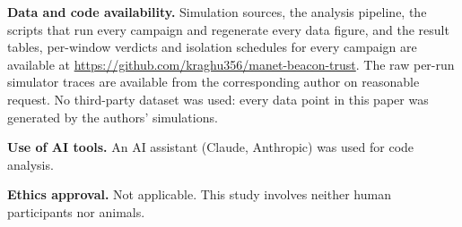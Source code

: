 \textbf{Data and code availability.} Simulation sources, the analysis
pipeline, the scripts that run every campaign and regenerate every data
figure, and the result tables, per-window verdicts and isolation schedules
for every campaign are available at
\url{https://github.com/kraghu356/manet-beacon-trust}. The raw per-run
simulator traces are available from the corresponding author
on reasonable request. No third-party dataset was used: every data point in
this paper was generated by the authors' simulations.

\textbf{Use of AI tools.} An AI assistant (Claude, Anthropic) was used for
code analysis.

\textbf{Ethics approval.} Not applicable. This study involves neither human
participants nor animals.
